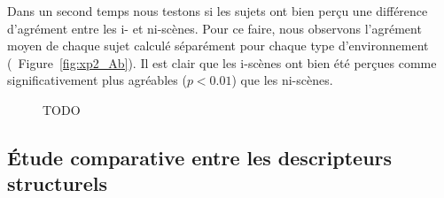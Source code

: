 Dans un second temps nous testons si les sujets ont bien perçu une différence d'agrément entre les i- et ni-scènes. Pour ce faire, nous observons l'agrément moyen de chaque sujet calculé séparément pour chaque type d'environnement (\Cf~Figure~\ref{fig:xp2_Ab}). Il est clair que les i-scènes ont bien été perçues comme significativement plus agréables ($p<0.01$) que les ni-scènes.

\begin{figure}[bth]
        \myfloatalign
       \caption[TODO]{TODO}\label{fig:xp2_A}
\end{figure}
 
\subsection{Étude comparative entre les descripteurs structurels}

